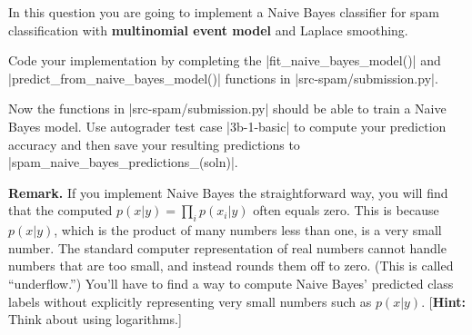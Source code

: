 \item {}
In this question you are going to implement a Naive Bayes classifier for spam
classification with {\bf multinomial event model} and Laplace smoothing.

Code your implementation by completing the |fit_naive_bayes_model()|
and |predict_from_naive_bayes_model()| functions in
|src-spam/submission.py|.

Now the functions in |src-spam/submission.py| should be able to train a Naive Bayes model.  Use autograder test case |3b-1-basic| to
compute your prediction accuracy and then save your resulting predictions
to\\|spam_naive_bayes_predictions_(soln)|.


{\bf Remark.} If you implement Naive Bayes the straightforward way, you will find
that the computed $p(x\vert y) = \prod_i p(x_i \vert  y)$ often equals zero.  This is
because $p(x\vert y)$, which is the product of many numbers less than one, is a very
small  number. The standard computer representation of real numbers cannot
handle numbers that are too small, and instead rounds them off to zero.  (This
is called  ``underflow.'')  You'll have to find a way to compute Naive Bayes'
predicted  class labels without explicitly representing very small numbers such
as $p(x\vert y)$.
[\textbf{Hint:} Think about using logarithms.]